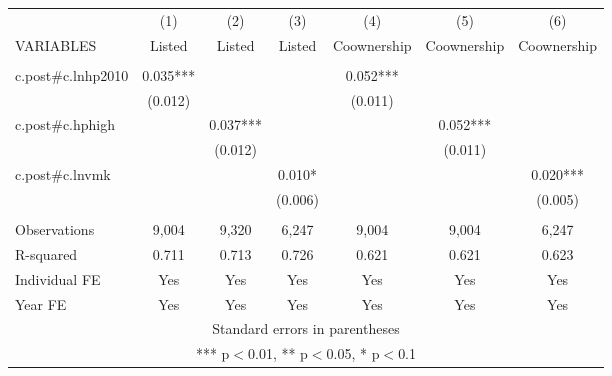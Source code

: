\begin{tabular}{lcccccc} \hline
 & (1) & (2) & (3) & (4) & (5) & (6) \\
VARIABLES & Listed & Listed & Listed & Coownership & Coownership & Coownership \\ \hline
 &  &  &  &  &  &  \\
c.post\#c.lnhp2010 & 0.035*** &  &  & 0.052*** &  &  \\
 & (0.012) &  &  & (0.011) &  &  \\
c.post\#c.hphigh &  & 0.037*** &  &  & 0.052*** &  \\
 &  & (0.012) &  &  & (0.011) &  \\
c.post\#c.lnvmk &  &  & 0.010* &  &  & 0.020*** \\
 &  &  & (0.006) &  &  & (0.005) \\
 &  &  &  &  &  &  \\
Observations & 9,004 & 9,320 & 6,247 & 9,004 & 9,004 & 6,247 \\
R-squared & 0.711 & 0.713 & 0.726 & 0.621 & 0.621 & 0.623 \\
Individual FE & Yes & Yes & Yes & Yes & Yes & Yes \\
 Year FE & Yes & Yes & Yes & Yes & Yes & Yes \\ \hline
\multicolumn{7}{c}{ Standard errors in parentheses} \\
\multicolumn{7}{c}{ *** p$<$0.01, ** p$<$0.05, * p$<$0.1} \\
\end{tabular}
